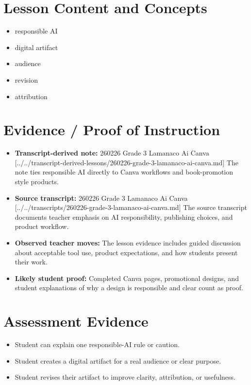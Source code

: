\documentclass[11pt]{article}
\begin{document}
\section*{Lesson Content and Concepts}
\begin{itemize}[leftmargin=*]
\item responsible AI
\item digital artifact
\item audience
\item revision
\item attribution
\end{itemize}

\section*{Evidence / Proof of Instruction}
\begin{itemize}[leftmargin=*]
\item \textbf{Transcript-derived note:} 260226 Grade 3 Lamanaco Ai Canva [../../transcript-derived-lessons/260226-grade-3-lamanaco-ai-canva.md] The note ties responsible AI directly to Canva workflows and book-promotion style products.
\item \textbf{Source transcript:} 260226 Grade 3 Lamanaco Ai Canva [../../transcripts/260226-grade-3-lamanaco-ai-canva.md] The source transcript documents teacher emphasis on AI responsibility, publishing choices, and product workflow.
\item \textbf{Observed teacher moves:} The lesson evidence includes guided discussion about acceptable tool use, product expectations, and how students present their work.
\item \textbf{Likely student proof:} Completed Canva pages, promotional designs, and student explanations of why a design is responsible and clear count as proof.
\end{itemize}

\section*{Assessment Evidence}
\begin{itemize}[leftmargin=*]
\item Student can explain one responsible-AI rule or caution.
\item Student creates a digital artifact for a real audience or clear purpose.
\item Student revises their artifact to improve clarity, attribution, or usefulness.
\end{itemize}
\end{document}
